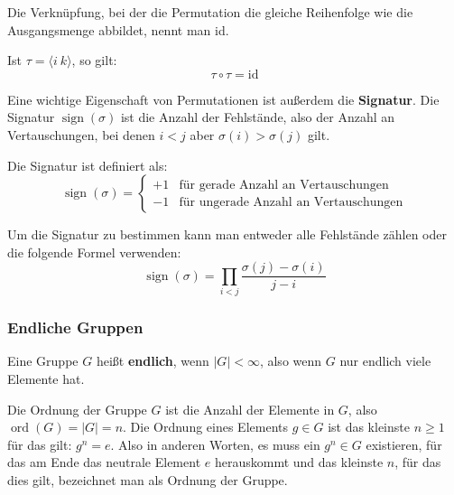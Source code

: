 \documentclass[11pt]{article}
\begin{document}
Die Verknüpfung, bei der die Permutation die gleiche Reihenfolge wie die Ausgangsmenge abbildet, nennt man id.

Ist $\tau = \langle i~k \rangle$, so gilt:
\[
  \tau \circ \tau = \text{id}
\]

Eine wichtige Eigenschaft von Permutationen ist außerdem die \textbf{Signatur}. Die Signatur $\operatorname{sign}(\sigma)$ ist die Anzahl
der Fehlstände, also der Anzahl an Vertauschungen, bei denen $i < j$ aber $\sigma(i) > \sigma(j)$ gilt.

Die Signatur ist definiert als:
\[
  \operatorname{sign}(\sigma) = \begin{cases}
    +1 & \text{für gerade Anzahl an Vertauschungen}   \\
    -1 & \text{für ungerade Anzahl an Vertauschungen}
  \end{cases}
\]

Um die Signatur zu bestimmen kann man entweder alle Fehlstände zählen oder die folgende Formel verwenden:
\[
  \operatorname{sign}(\sigma) = \prod\limits_{i < j}\frac{\sigma(j) - \sigma(i)}{j - i}
\]

\subsubsection{Endliche Gruppen}
Eine Gruppe $G$ heißt \textbf{endlich}, wenn $|G| < \infty$, also wenn $G$ nur endlich viele Elemente hat.

Die Ordnung der Gruppe $G$ ist die Anzahl der Elemente in $G$, also $\operatorname{ord}(G) = |G| = n$.
Die Ordnung eines Elements $g \in G$ ist das kleinste $n \ge 1$ für das gilt: $g^n=e$. Also in anderen Worten, es muss
ein $g^n\in G$ existieren, für das am Ende das neutrale Element $e$ herauskommt und das kleinste $n$, für das dies gilt,
bezeichnet man als Ordnung der Gruppe.
\end{document}
